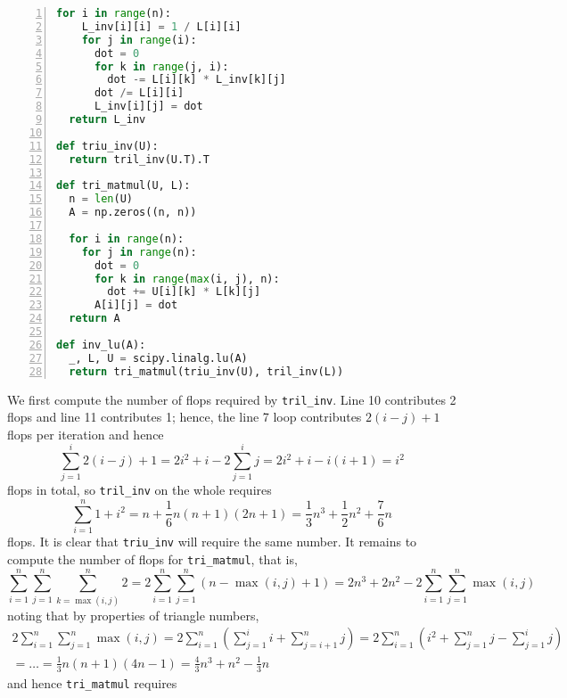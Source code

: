 \documentclass{../../../kin_math}
\begin{document}
\begin{questions}
\begin{enumerate}
\begin{solution}
\begin{lstlisting}[language=python, numbers=left, xleftmargin=5em]
  for i in range(n):
    L_inv[i][i] = 1 / L[i][i]
    for j in range(i):
      dot = 0
      for k in range(j, i):
        dot -= L[i][k] * L_inv[k][j]
      dot /= L[i][i]
      L_inv[i][j] = dot
  return L_inv

def triu_inv(U):
  return tril_inv(U.T).T

def tri_matmul(U, L):
  n = len(U)
  A = np.zeros((n, n))

  for i in range(n):
    for j in range(n):
      dot = 0
      for k in range(max(i, j), n):
        dot += U[i][k] * L[k][j]
      A[i][j] = dot
  return A

def inv_lu(A):
  _, L, U = scipy.linalg.lu(A)
  return tri_matmul(triu_inv(U), tril_inv(L))
      \end{lstlisting}
      We first compute the number of flops required by \texttt{tril\_inv}. Line 10 contributes 2 flops and line 11 contributes 1; hence, the line 7 loop contributes $2(i - j) + 1$ flops per iteration and hence
      \begin{equation*}
        \sum_{j = 1}^i 2(i - j) + 1 = 2i^2 + i - 2\sum_{j = 1}^i j = 2i^2 + i - i(i + 1) = i^2
      \end{equation*}
      flops in total, so \texttt{tril\_inv} on the whole requires
      \begin{equation*}
        \sum_{i = 1}^n 1 + i^2 = n + \frac{1}{6}n(n + 1)(2n + 1) = \frac{1}{3}n^3 + \frac{1}{2}n^2 + \frac{7}{6}n
      \end{equation*}
      flops. It is clear that \texttt{triu\_inv} will require the same number. It remains to compute the number of flops for \texttt{tri\_matmul}, that is,
      \begin{equation*}
        \sum_{i = 1}^n \sum_{j = 1}^n \sum_{k = \max(i, j)}^n 2 = 2 \sum_{i = 1}^n \sum_{j = 1}^n (n - \max(i, j) + 1) = 2n^3 + 2n^2 - 2 \sum_{i = 1}^n \sum_{j = 1}^n \max(i, j)
      \end{equation*}
      noting that by properties of triangle numbers,
      \begin{multline*}
        2 \sum_{i = 1}^n \sum_{j = 1}^n \max(i, j) = 2 \sum_{i = 1}^n \left(\sum_{j = 1}^i i + \sum_{j = i + 1}^n j\right) = 2 \sum_{i = 1}^n \left(i^2 + \sum_{j = 1}^n j - \sum_{j = 1}^i j\right) \\
        = \dots = \frac{1}{3}n(n + 1)(4n - 1) = \frac{4}{3}n^3 + n^2 - \frac{1}{3}n
      \end{multline*}
      and hence \texttt{tri\_matmul} requires
      \begin{equation*}

\end{equation*}
\end{solution}
\end{enumerate}
\end{questions}
\end{document}
